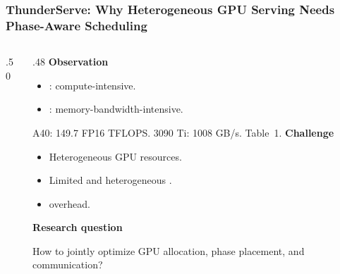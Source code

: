 
\begin{frame}[t,label=main_ts_why]
\frametitle{\fontsize{11}{13}\selectfont ThunderServe: Why Heterogeneous GPU Serving Needs Phase-Aware Scheduling}
\begin{columns}[T,onlytextwidth]
\begin{column}{.50\textwidth}
\end{column}
\begin{column}{.48\textwidth}
{\normalsize\textbf{Observation}}
\begin{itemize}\setlength{\itemsep}{.06cm}\footnotesize
\item {}: compute-intensive.
\item {}: memory-bandwidth-intensive.
\end{itemize}
\vspace{.08cm}
{\footnotesize A40: 149.7 FP16 TFLOPS. 3090 Ti: 1008 GB/s. Table~1.}
\vspace{.12cm}
{\normalsize\textbf{Challenge}}
\begin{itemize}\setlength{\itemsep}{.06cm}\footnotesize
\item Heterogeneous GPU resources.
\item Limited and heterogeneous .
\item {} overhead.
\end{itemize}
\vspace{.10cm}
{\footnotesize\textbf{Research question}\par}
{\footnotesize How to jointly optimize GPU allocation, phase placement, and communication?\par}
\end{column}
\end{columns}
\vspace{.10cm}
\end{frame}


